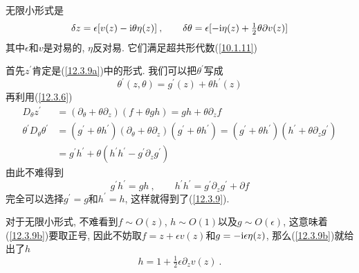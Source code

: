无限小形式是
\begin{equation}
    \delta z= \epsilon[v(z)-\mathrm{i}\theta\eta(z)] \:, \qquad 
    \delta \theta =\epsilon[-\mathrm{i}\eta(z)+\tfrac{1}{2}\theta\partial v(z)]  \label{12.3.10}
\end{equation}
其中$ \epsilon $和$ v $是对易的, $ \eta $反对易. 它们满足超共形代数(\ref{10.1.11})
\begin{tcolorbox}
首先$ z^{\prime} $肯定是(\ref{12.3.9a})中的形式. 我们可以把$ \theta^{\prime} $写成
\[
\theta^{\prime}(z,\theta)=g^{\prime}(z)+\theta h^{\prime}(z)
\]
再利用(\ref{12.3.6})
\begin{align*}
    D_{\theta}z^{\prime} &= (\partial_{\theta}+\theta\partial_{z})(f+\theta gh)= gh+\theta \partial_{z} f \\
    \theta^{\prime}D_{\theta}\theta^{\prime} &=(g^{\prime}+\theta h^{\prime})(\partial_{\theta}+\theta\partial_{z})
    (g^{\prime}+\theta h^{\prime})
    =(g^{\prime}+\theta h^{\prime})(h^{\prime}+\theta \partial_{z} g^{\prime}) \\
    &=g^{\prime}h^{\prime}+\theta (h^{\prime}h^{\prime}-g^{\prime}\partial_{z} g^{\prime})
\end{align*}
由此不难得到
\[
g^{\prime}h^{\prime}=gh \:, \qquad h^{\prime}h^{\prime}=g^{\prime}\partial_{z} g^{\prime}+\partial f 
\]
完全可以选择$ g^{\prime}=g $和$ h^{\prime}=h$, 这样就得到了(\ref{12.3.9}).

对于无限小形式, 不难看到$ f\sim O(z)$, $h\sim O(1) $以及$ g\sim O(\epsilon)$, 这意味着(\ref{12.3.9b})要取正号, 因此不妨取$ f=z+\epsilon v(z) $和$ g=-\mathrm{i}\epsilon\eta(z) $, 那么(\ref{12.3.9b})就给出了$ h$
\[
h=1+\tfrac{1}{2}\epsilon\partial_{z}v(z) \:.
\]
\end{tcolorbox}


